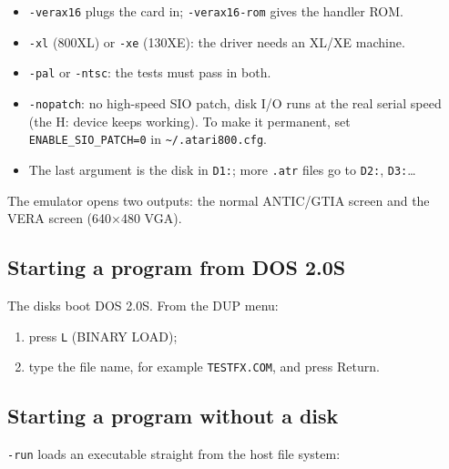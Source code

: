 \documentclass[
]{article}
\newenvironment{Shaded}{}{}
\newcommand{\AttributeTok}[1]{\textcolor[rgb]{0.49,0.56,0.16}{#1}}
\newcommand{\DataTypeTok}[1]{\textcolor[rgb]{0.56,0.13,0.00}{#1}}
\newcommand{\NormalTok}[1]{#1}
\newcommand{\VariableTok}[1]{\textcolor[rgb]{0.10,0.09,0.49}{#1}}
\providecommand{\tightlist}{%
  \setlength{\itemsep}{0pt}\setlength{\parskip}{0pt}}
\begin{document}
\begin{itemize}
\tightlist
\item
  \texttt{-verax16} plugs the card in; \texttt{-verax16-rom} gives the
  handler ROM.
\item
  \texttt{-xl} (800XL) or \texttt{-xe} (130XE): the driver needs an
  XL/XE machine.
\item
  \texttt{-pal} or \texttt{-ntsc}: the tests must pass in both.
\item
  \texttt{-nopatch}: no high-speed SIO patch, disk I/O runs at the real
  serial speed (the H: device keeps working). To make it permanent, set
  \texttt{ENABLE\_SIO\_PATCH=0} in
  \texttt{\textasciitilde{}/.atari800.cfg}.
\item
  The last argument is the disk in \texttt{D1:}; more \texttt{.atr}
  files go to \texttt{D2:}, \texttt{D3:}\ldots{}
\end{itemize}

The emulator opens two outputs: the normal ANTIC/GTIA screen and the
VERA screen (640×480 VGA).

\subsection{Starting a program from DOS
2.0S}\label{starting-a-program-from-dos-2.0s}

The disks boot DOS 2.0S. From the DUP menu:

\begin{enumerate}
\def\labelenumi{\arabic{enumi}.}
\tightlist
\item
  press \texttt{L} (BINARY LOAD);
\item
  type the file name, for example \texttt{TESTFX.COM}, and press Return.
\end{enumerate}

\subsection{Starting a program without a
disk}\label{starting-a-program-without-a-disk}

\texttt{-run} loads an executable straight from the host file system:

\begin{Shaded}
\end{Shaded}
\end{document}
